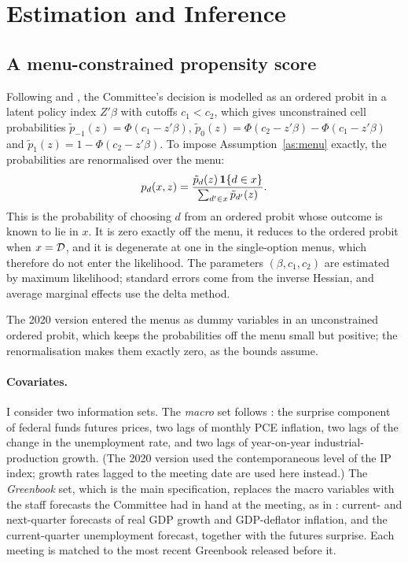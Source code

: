 \section{Estimation and Inference}\label{sec:estimation}

\subsection{A menu-constrained propensity score}

Following \citet{angrist2011} and \citet{angrist2018}, the Committee's decision is modelled as an ordered probit
in a latent policy index $Z'\beta$ with cutoffs $c_1<c_2$, which gives unconstrained cell probabilities
$\tilde p_{-1}(z)=\Phi(c_1-z'\beta)$, $\tilde p_0(z)=\Phi(c_2-z'\beta)-\Phi(c_1-z'\beta)$ and
$\tilde p_1(z)=1-\Phi(c_2-z'\beta)$. To impose Assumption~\ref{as:menu} exactly, the probabilities are renormalised
over the menu:
\begin{equation}\label{eq:pscore}
  p_d(x,z)=\frac{\tilde p_d(z)\,\mathbf{1}\{d\in x\}}{\sum_{d'\in x}\tilde p_{d'}(z)} .
\end{equation}
This is the probability of choosing $d$ from an ordered probit whose outcome is known to lie in $x$. It is zero
exactly off the menu, it reduces to the ordered probit when $x=\mathcal{D}$, and it is degenerate at one in the
single-option menus, which therefore do not enter the likelihood. The parameters $(\beta,c_1,c_2)$ are estimated
by maximum likelihood; standard errors come from the inverse Hessian, and average marginal effects use the
delta method.

The 2020 version entered the menus as dummy variables in an unconstrained ordered probit, which keeps the
probabilities off the menu small but positive; the renormalisation makes them exactly zero, as the bounds assume.

\paragraph{Covariates.} I consider two information sets. The \emph{macro} set follows \citet{angrist2018}: the
surprise component of federal funds futures prices, two lags of monthly PCE inflation, two lags of the change in
the unemployment rate, and two lags of year-on-year industrial-production growth. (The 2020 version used the
contemporaneous level of the IP index; growth rates lagged to the meeting date are used here instead.) The
\emph{Greenbook} set, which is the main specification, replaces the macro variables with the staff forecasts the
Committee had in hand at the meeting, as in \citet{romer2004}: current- and next-quarter forecasts of real GDP
growth and GDP-deflator inflation, and the current-quarter unemployment forecast, together with the futures
surprise. Each meeting is matched to the most recent Greenbook released before it.

